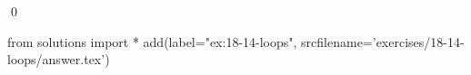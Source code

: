 
\begin{ex}
  \label{ex:18-14-loops}
  
  \qed
\end{ex}
\begin{python0}
from solutions import *
add(label="ex:18-14-loops",
    srcfilename='exercises/18-14-loops/answer.tex')
\end{python0}
